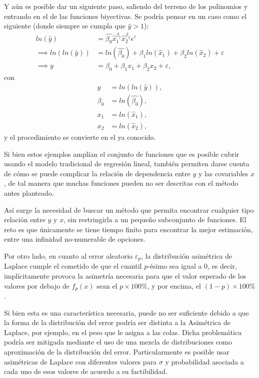 Y a\'un es posible dar un siguiente paso, saliendo del terreno de los polinomios y entrando en el de las funciones biyectivas. Se podr\'ia pensar en un caso como el siguiente (donde siempre se cumpla que $\hat{y} > 1$):
\begin{equation*}
\begin{aligned}
    ln(\hat{y}) &= \hat{\beta_0}\hat{x}_1^{\beta_1}\hat{x}_2^{\beta_2} e^{\varepsilon} \\
    \implies ln(ln(\hat{y})) &= ln(\hat{\beta_0}) + \beta_1 ln(\hat{x}_1) + \beta_2 ln(\hat{x}_2) + \varepsilon \\
    \implies y &= \beta_0 + \beta_1 x_1 + \beta_2 x_2 + \varepsilon, 
\end{aligned}
\end{equation*}
con
\begin{equation*}
\begin{aligned}
    y &= ln(ln(\hat{y})), \\
    \beta_0 &= ln(\hat{\beta_0}), \\
    x_1 &= ln(\hat{x}_1), \\
    x_2 &= ln(\hat{x}_2),
\end{aligned}
\end{equation*}
y el procedimiento se convierte en el ya conocido.

Si bien estos ejemplos ampl\'ian el conjunto de funciones que es posible cubrir usando el modelo tradicional de regresi\'on lineal, tambi\'en permiten darse cuenta de c\'omo se puede complicar la relaci\'on de dependencia entre $y$ y las covariables $x$, de tal manera que muchas funciones pueden no ser descritas con el m\'etodo antes planteado.

As\'i surge la necesidad de buscar un m\'etodo que permita encontrar cualquier tipo relaci\'on entre $y$ y $x$, sin restringirla a un pequeño subconjunto de funciones. El reto es que \'unicamente se tiene tiempo finito para encontrar la mejor estimaci\'on, entre una infinidad no-numerable de opciones.

Por otro lado, en cuanto al error aleatorio $\varepsilon_p$, la distribuci\'on asim\'etrica de Laplace cumple el cometido de que el cuantil $p$-\'esimo sea igual a 0, es decir, impl\'icitamente provoca la asimetr\'ia necesaria para que el valor esperado de los valores por debajo de $f_p(x)$ sean el $p \times 100\%$, y por encima, el $(1-p) \times 100\%$.

Si bien esta es una caracter\'istica necesaria, puede no ser suficiente debido a que la forma de la distribuci\'on del error podr\'ia ser distinta a la Asim\'etrica de Laplace, por ejemplo, en el peso que le asigna a las colas. Dicha problem\'atica podr\'ia ser mitigada mediante el uso de una mezcla de distribuciones como aproximaci\'on de la distribuci\'on del error.  Particularmente es posible usar asim\'etricas de Laplace con diferentes valores para $\sigma$ y probabilidad asociada a cada uno de esos valores de acuerdo a su factibilidad. 

